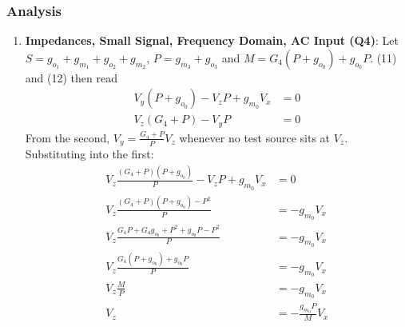 \subsubsection{Analysis}
\begin{enumerate}
  \item \textbf{Impedances, Small Signal, Frequency Domain, AC Input (Q4)}:
    Let \(S = g_{o_1} + g_{m_1} + g_{o_2} + g_{m_2}\),
    \(P = g_{m_3} + g_{o_3}\) and \(M = G_4(P + g_{o_0}) + g_{o_0} P\).
    (11) and (12) then read
    \begin{align*}
      V_{y}(P + g_{o_0}) - V_{z} P + g_{m_0} V_{x} &= 0 \\
      V_{z}(G_4 + P) - V_{y} P &= 0
    \end{align*}
    From the second, \(V_{y} = \frac{G_4 + P}{P} V_{z}\) whenever no test source
    sits at \(V_z\). Substituting into the first:
    \begin{align*}
      V_{z}\frac{(G_4 + P)(P + g_{o_0})}{P} - V_{z} P + g_{m_0} V_{x} &= 0 \\
      V_{z}\frac{(G_4 + P)(P + g_{o_0}) - P^2}{P} &= -g_{m_0} V_{x} \\
      V_{z}\frac{G_4 P + G_4 g_{o_0} + P^2 + g_{o_0} P - P^2}{P} &= -g_{m_0} V_{x} \\
      V_{z}\frac{G_4 (P + g_{o_0}) + g_{o_0} P}{P} &= -g_{m_0} V_{x} \\
      V_{z}\frac{M}{P} &= -g_{m_0} V_{x} \\
      V_{z} &= -\frac{g_{m_0} P}{M} V_{x} \tag{16}
    \end{align*}

\end{enumerate}
